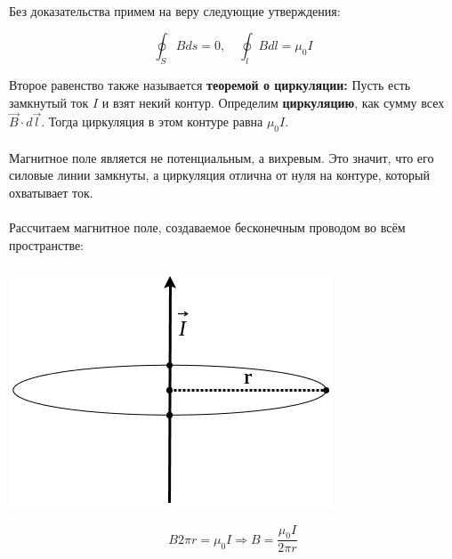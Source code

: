 \documentclass[dvipdfmx]{article}
\begin{document}
\paragraph{}

Без доказательства примем на веру следующие утверждения:

\begin{equation*}
  \oint_SBds = 0, \quad \oint_lBdl = \mu_0I
\end{equation*}

Второе равенство также называется \textbf{теоремой о циркуляции:} Пусть есть замкнутый ток $I$ и взят некий контур.
Определим \textbf{циркуляцию}, как сумму всех $\vec{B}\cdot d\vec{l}$. Тогда циркуляция в этом контуре равна $\mu_0I$.

\paragraph{}

Магнитное поле является не потенциальным, а вихревым. Это значит, что его силовые линии замкнуты,
а циркуляция отлична от нуля на контуре, который охватывает ток.

\paragraph{}

Рассчитаем магнитное поле, создаваемое бесконечным проводом во всём пространстве:
\paragraph{}
\begin{minipage}{0.4\linewidth}
  \includegraphics[width=\linewidth,natwidth=364,natheight=266]{images/4.jpg}
\end{minipage}
\begin{minipage}{0.5\linewidth}
  \begin{equation*}
    B2\pi r = \mu_0I \Rightarrow B = \frac{\mu_0I}{2\pi r}
  \end{equation*}
\end{minipage}
\end{document}
